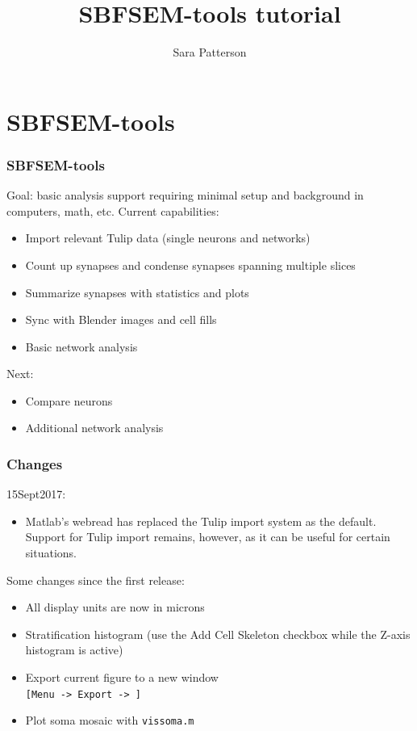 \documentclass[11pt]{beamer}
\title{SBFSEM-tools tutorial}
\author{Sara Patterson}
\institute{University of Washington}
\begin{document}
	\maketitle
	\tableofcontents
\section{SBFSEM-tools}
\begin{frame}
	\frametitle{SBFSEM-tools}
	Goal: basic analysis support requiring minimal setup and background in computers, math, etc.
	\vskip10pt
	Current capabilities:
	\begin{itemize}
		\item Import relevant Tulip data (single neurons and networks)
		\item Count up synapses and condense synapses spanning multiple slices 
		\item Summarize synapses with statistics and plots
		\item Sync with Blender images and cell fills
		\item Basic network analysis
	\end{itemize}
	Next:\\
	\begin{itemize}
		\item Compare neurons
		\item Additional network analysis
	\end{itemize}
\end{frame}
\begin{frame}
	\frametitle{Changes}
	15Sept2017:
	\begin{itemize}
		\item Matlab's webread has replaced the Tulip import system as the default. Support for Tulip import remains, however, as it can be useful for certain situations.
	\end{itemize}
	Some changes since the first release:
	\begin{itemize}
		\item All display units are now in microns
		\item Stratification histogram (use the Add Cell Skeleton checkbox while the Z-axis histogram is active)
		\item Export current figure to a new window\\ \texttt{[Menu -> Export -> ]}
		\item Plot soma mosaic with \texttt{vissoma.m}
	\end{itemize}
\end{frame}
\end{document}
